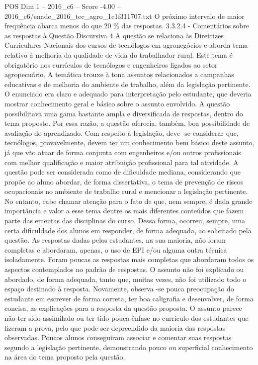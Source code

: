 \begin{textsample}{POS Dim 1 – 2016\_c6 – Score -4.00 – 2016\_c6/enade\_2016\_tec\_agro\_1c1f311707.txt}
O próximo intervalo de maior frequência abarca menos do que 20 \% das respostas. 3.3.2.4 - Comentários sobre as respostas à Questão Discursiva 4 A questão se relaciona às Diretrizes Curriculares Nacionais dos cursos de tecnólogos em agronegócios e aborda tema relativo à melhoria da qualidade de vida do trabalhador rural.
Este tema é obrigatório nos currículos de tecnólogos e engenheiros ligados ao setor agropecuário.
A temática trouxe à tona assuntos relacionados a campanhas educativas e de melhoria do ambiente de trabalho, além da legislação pertinente.
O enunciado era claro e adequado para interpretação pelo estudante, que deveria mostrar conhecimento geral e básico sobre o assunto envolvido.
A questão possibilitava uma gama bastante ampla e diversificada de respostas, dentro do tema proposto.
Por essa razão, a questão oferecia, também, boa possibilidade de avaliação do aprendizado.
Com respeito à legislação, deve -se considerar que, tecnólogos, provavelmente, devem ter um conhecimento bem básico deste assunto, já que vão atuar de forma conjunta com engenheiros e/ou outros profissionais com melhor qualificação e maior atribuição profissional para tal atividade.
A questão pode ser considerada como de dificuldade mediana, considerando que propõe ao aluno abordar, de forma dissertativa, o tema de prevenção de riscos ocupacionais no ambiente de trabalho rural e mencionar a legislação pertinente.
No entanto, cabe chamar atenção para o fato de que, nem sempre, é dada grande importância e valor a esse tema dentre os mais diferentes conteúdos que fazem parte das ementas das disciplinas do curso.
Dessa forma, ocorreu, sempre, uma certa dificuldade dos alunos em responder, de forma adequada, ao solicitado pela questão.
As respostas dadas pelos estudantes, na sua maioria, não foram completas e abordaram, apenas, o uso de EPI e/ou alguma outra técnica isoladamente.
Foram poucas as respostas mais completas que abordaram todos os aspectos contemplados no padrão de respostas.
O assunto não foi explicado ou abordado, de forma adequada, tanto que, muitas vezes, não foi utilizado todo o espaço destinado à resposta.
Novamente, observa -se pouca preocupação do estudante em escrever de forma correta, ter boa caligrafia e desenvolver, de forma concisa, as explicações para a resposta da questão proposta.
O assunto parece não ter sido assimilado ou ter tido pouca ênfase no currículo dos estudantes que fizeram a prova, pelo que pode ser depreendido da maioria das respostas observadas.
Poucos alunos conseguiram associar e comentar suas respostas segundo a legislação pertinente, demonstrando pouco ou superficial conhecimento na área do tema proposto pela questão.

\end{textsample}
